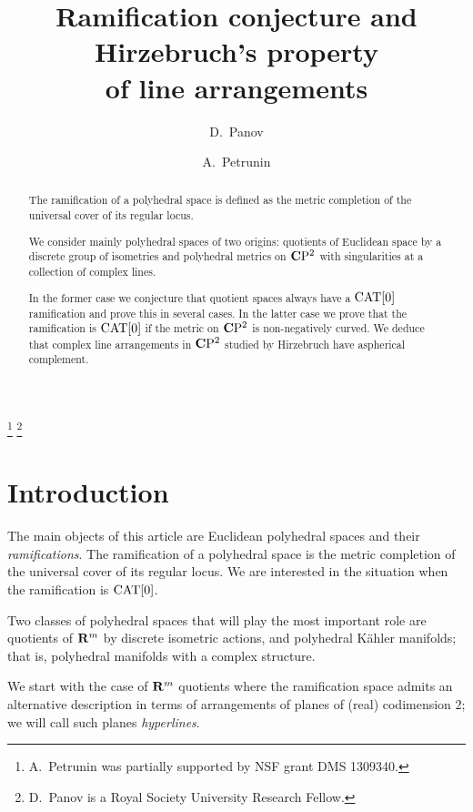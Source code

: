 \documentclass{compositio}
\begin{document}
\title{Ramification conjecture and\\ 
Hirzebruch's property\\ 
of line arrangements}
\author{D.~Panov}
\address{Department of Mathematics,
King's College London,
Strand,
London,
WC2R 2LS}
\author{A.~Petrunin}
\address{Penn State University Mathematics Dept.
University Park, State College, PA 16802}
\date{}
\thanks{A.~Petrunin was partially supported by NSF grant DMS 1309340.}
\thanks{D.~Panov is a Royal Society University Research Fellow.}

\begin{abstract}
The ramification of a polyhedral space is defined as the metric completion of the universal cover of its regular locus.

We consider mainly 
polyhedral spaces of two origins: quotients of Euclidean space by a discrete group of isometries and polyhedral metrics on $\mathbf{C}\mathrm{P}^2$ with singularities at a collection of complex lines. 

In the former case we conjecture that quotient spaces always have a $\mathrm{CAT}[0]$ ramification and prove this in several cases.  In the latter case  we prove that the ramification is $\mathrm{CAT}[0]$ if the metric on $\mathbf{C}\mathrm{P}^2$ is non-negatively curved. We deduce that complex line arrangements in $\mathbf{C}\mathrm{P}^2$ studied by Hirzebruch have aspherical complement.
\end{abstract}
\maketitle


\section{Introduction}

The main objects of this article are Euclidean polyhedral spaces and their \emph {ramifications}. The ramification  of a polyhedral space is the metric completion of the universal cover of its regular locus. We are interested in the situation when the ramification is $\mathrm{CAT}[0]$. 

Two classes of polyhedral spaces that will play the most important role are quotients of $\mathbf{R}^m$ by discrete isometric actions, and polyhedral K\"ahler manifolds; 
that is, polyhedral manifolds with a complex structure. 

We start with the case of $\mathbf{R}^m$ quotients where the ramification space admits an alternative description in terms of  arrangements of planes of (real) codimension $2$;
we will call such planes \emph{hyperlines}.
\end{document}
